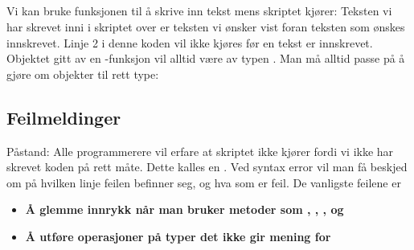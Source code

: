 \subsection{}
Vi kan bruke funksjonen  til å skrive inn tekst mens skriptet kjører:
Teksten vi har skrevet inni  i skriptet over er teksten vi ønsker vist foran teksten som ønskes innskrevet. Linje 2 i denne koden vil ikke kjøres før en tekst er innskrevet.
\newpage
Objektet gitt av en -funksjon vil alltid være av typen . Man må alltid passe på å gjøre om objekter til rett type:
\subsection{Feilmeldinger}
Påstand: Alle programmerere vil erfare at skriptet ikke kjører fordi vi ikke har skrevet koden på rett måte. Dette kalles en . Ved syntax error vil man få beskjed om på hvilken linje feilen befinner seg, og hva som er feil. De vanligste feilene er
\begin{itemize}
\item \textbf{Å glemme innrykk når man bruker metoder som , , , og  }
\newpage
\item \textbf{Å utføre operasjoner på typer det ikke gir mening for}
\end{itemize}

\newpage



